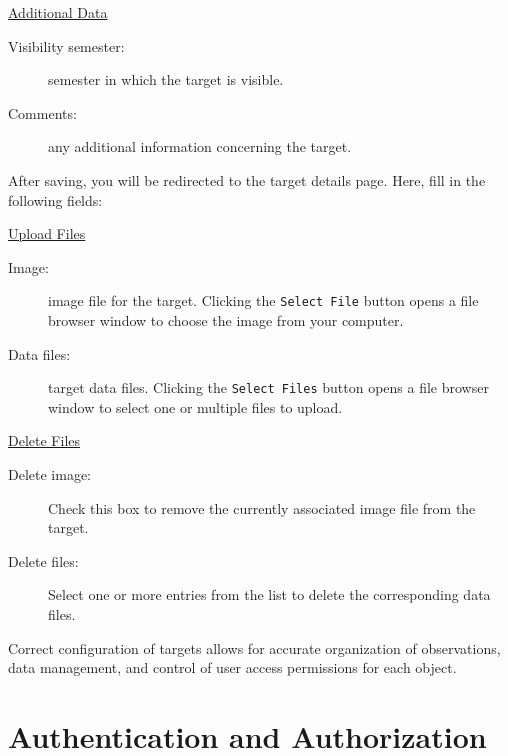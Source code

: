 
\newpage

\underline{Additional Data}

\begin{description}
	\item[Visibility semester:] semester in which the target is visible.
	\item[Comments:] any additional information concerning the target.
\end{description}


After saving, you will be redirected to the target details page. Here, fill in the following fields: 

\underline{Upload Files}

\begin{description}
	\item[Image:] image file for the target. Clicking the \texttt{Select File} button opens a file browser window to choose the image from your computer.
	\item[Data files:] target data files. Clicking the \texttt{Select Files} button opens a file browser window to select one or multiple files to upload.
\end{description}


\underline{Delete Files}

\begin{description}
	\item[Delete image:] Check this box to remove the currently associated image file from the target.
	\item[Delete files:] Select one or more entries from the list to delete the corresponding data files.
\end{description}


Correct configuration of targets allows for accurate organization of observations, data management, and control of user access permissions for each object.


\section{Authentication and Authorization}

